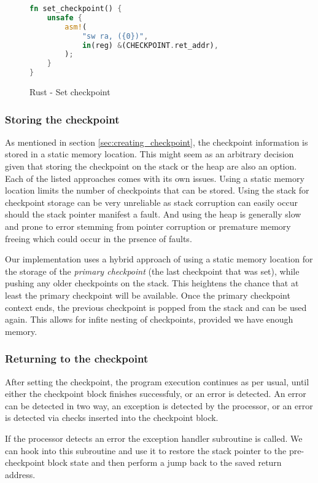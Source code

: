 \begin{figure}[!h]
\begin{lstlisting}[language=Rust]
fn set_checkpoint() {
    unsafe {
        asm!(
            "sw ra, ({0})",
            in(reg) &(CHECKPOINT.ret_addr),
        );
    }
}
\end{lstlisting}
\caption{Rust - Set checkpoint}
\label{fig:rust_set_checkpoint}
\end{figure}

\subsubsection{Storing the checkpoint}

As mentioned in section \ref{sec:creating_checkpoint}, the checkpoint information is stored in a static memory location. This might seem as an arbitrary decision given that storing the checkpoint on the stack or the heap are also an option. Each of the listed approaches comes with its own issues. Using a static memory location limits the number of checkpoints that can be stored. Using the stack for checkpoint storage can be very unreliable as stack corruption can easily occur should the stack pointer manifest a fault. And using the heap is generally slow and prone to error stemming from pointer corruption or premature memory freeing which could occur in the prsence of faults.

Our implementation uses a hybrid approach of using a static memory location for the storage of the \textit{primary checkpoint} (the last checkpoint that was set), while pushing any older checkpoints on the stack. This heightens the chance that at least the primary checkpoint will be available. Once the primary checkpoint context ends, the previous checkpoint is popped from the stack and can be used again. This allows for infite nesting of checkpoints, provided we have enough memory.

\subsubsection{Returning to the checkpoint}

After setting the checkpoint, the program execution continues as per usual, until either the checkpoint block finishes successfuly, or an error is detected. An error can be detected in two way, an exception is detected by the processor, or an error is detected via checks inserted into the checkpoint block.

If the processor detects an error the exception handler subroutine is called. We can hook into this subroutine and use it to restore the stack pointer to the pre-checkpoint block state and then perform a jump back to the saved return address.

